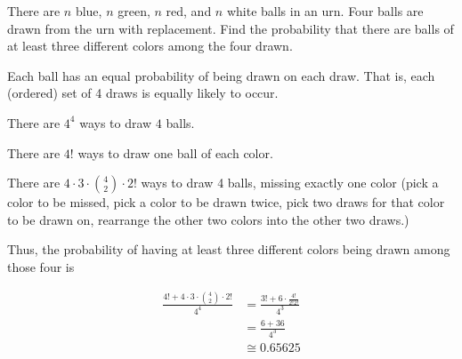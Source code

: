 \begin{problem}[Handout 2, \# 19]
  There are \(n\) blue, \(n\) green, \(n\) red, and \(n\) white balls in an
  urn. Four balls are drawn from the urn with replacement. Find the
  probability that there are balls of at least three different colors among
  the four drawn.
\end{problem}
\begin{solution}
Each ball has an equal probability of being drawn on each draw. That is, each (ordered) set of 4 draws is equally likely to occur.

There are $4^4$ ways to draw $4$ balls.

There are $4!$ ways to draw one ball of each color.

There are $4 \cdot 3 \cdot \binom{4}{2} \cdot 2!$ ways to draw 4 balls, missing exactly one color (pick a color to be missed, pick a color to be drawn twice, pick two draws for that color to be drawn on, rearrange the other two colors into the other two draws.)

Thus, the probability of having at least three different colors being drawn among those four is

\begin{align*}
\frac{4! + 4 \cdot 3 \cdot \binom{4}{2} \cdot 2!}{4^4} &= \frac{3!+6 \cdot \frac{4!}{2!2!}}{4^3} \\
&= \frac{6+36}{4^3}\\
&\cong 0.65625\\
\end{align*}
\end{solution}

